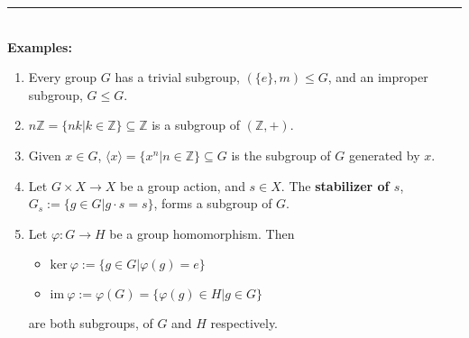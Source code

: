 \documentclass{article}
\begin{document}
\hrule
\vspace{2mm}~\\
\textbf{Examples:}\\
\begin{enumerate}
\item Every group $G$ has a trivial subgroup, $(\lbrace e\rbrace,m)\leq G$, and an improper subgroup, $G\leq G$.
\item $n\mathbb{Z}=\lbrace nk|k\in\mathbb{Z}\rbrace\subseteq \mathbb{Z}$ is a subgroup of $(\mathbb{Z},+)$.
\item Given $x\in G$, $\langle x\rangle=\lbrace x^n|n\in \mathbb{Z}\rbrace\subseteq G$ is the subgroup of $G$ generated by $x$.
\item Let $G\times X\rightarrow X$ be a group action, and $s\in X$. The \textbf{stabilizer of $s$}, $G_s:=\lbrace g\in G|g\cdot s=s\rbrace$, forms a subgroup of $G$.
\item Let $\varphi:G\rightarrow H$ be a group homomorphism. Then
\begin{itemize}
\item $\mathrm{ker }~\varphi:=\lbrace g\in G | \varphi(g)=e\rbrace$
\item $\mathrm{im }~\varphi:=\varphi(G)=\lbrace \varphi(g)\in H | g\in G\rbrace$
\end{itemize}
are both subgroups, of $G$ and $H$ respectively.
\end{enumerate}
\newpage
\end{document}
